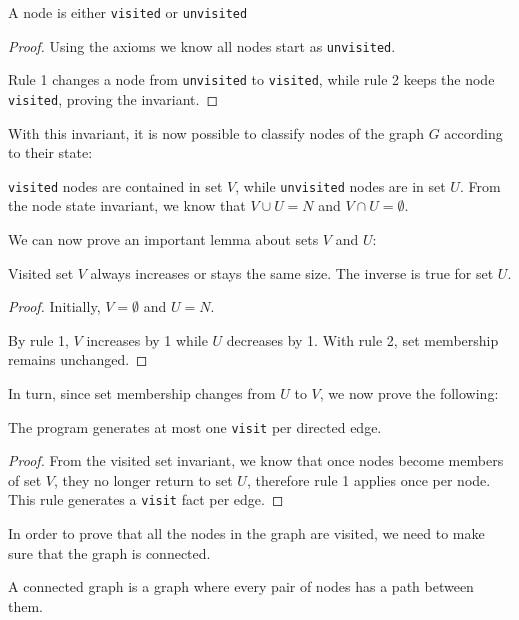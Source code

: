 \begin{invariant}
A node is either \texttt{visited} or \texttt{unvisited}
\end{invariant}
\begin{proof}
Using the axioms we know all nodes start as \texttt{unvisited}.

Rule 1 changes a node from \texttt{unvisited} to \texttt{visited}, while rule 2
keeps the node \texttt{visited}, proving the invariant.
\end{proof}

With this invariant, it is now possible to classify nodes of the graph $G$
according to their state:

\begin{definition} \texttt{visited} nodes are contained in set $V$,
while \texttt{unvisited} nodes are in set $U$. From the node state invariant, we
know that $V \cup U = N$ and $V \cap U = \emptyset$.
\end{definition}

We can now prove an important lemma about sets $V$ and $U$:

\begin{invariant}
Visited set $V$ always increases or stays the same size. The inverse is true for
set $U$.
\end{invariant}
\begin{proof}
Initially, $V = \emptyset$ and $U = N$.

By rule 1, $V$ increases by 1 while $U$ decreases by 1. With rule 2, set
membership remains unchanged.
\end{proof}

In turn, since set membership changes from $U$ to $V$, we now prove the
following:

\begin{lemma}
The program generates at most one \texttt{visit} per directed edge.
\end{lemma}
\begin{proof}
From the visited set invariant, we know that once nodes become members of set $V$,
they no longer return to set $U$, therefore rule 1 applies once per
node. This rule generates a \texttt{visit} fact per edge.
\end{proof}

In order to prove that all the nodes in the graph are visited, we need to make
sure that the graph is connected.

\begin{definition}
A connected graph is a graph where every pair of nodes has a path between them.
\end{definition}

